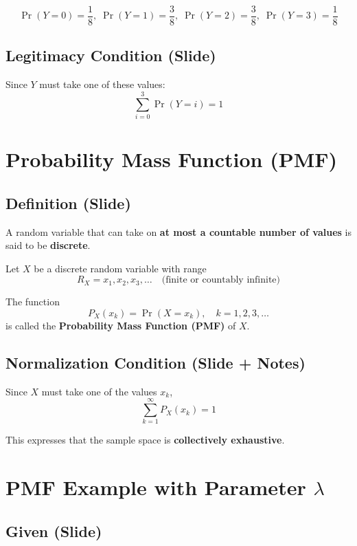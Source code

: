 \documentclass[11pt]{article}
\begin{document}
\[
\Pr(Y=0)=\frac{1}{8},\;
\Pr(Y=1)=\frac{3}{8},\;
\Pr(Y=2)=\frac{3}{8},\;
\Pr(Y=3)=\frac{1}{8}
\]

\subsection*{Legitimacy Condition (Slide)}

Since \( Y \) must take one of these values:
\[
\sum_{i=0}^{3} \Pr(Y=i)=1
\]

\vspace{1em}

\section{Probability Mass Function (PMF)}

\subsection*{Definition (Slide)}

A random variable that can take on \textbf{at most a countable number of values} is said to be \textbf{discrete}.

Let \( X \) be a discrete random variable with range
\[
R_X = x_1, x_2, x_3, \ldots
\quad \text{(finite or countably infinite)}
\]

The function
\[
P_X(x_k) = \Pr(X = x_k), \quad k=1,2,3,\ldots
\]
is called the \textbf{Probability Mass Function (PMF)} of \( X \).

\subsection*{Normalization Condition (Slide + Notes)}

Since \( X \) must take one of the values \( x_k \),
\[
\sum_{k=1}^{\infty} P_X(x_k) = 1
\]

This expresses that the sample space is \textbf{collectively exhaustive}.

\vspace{1em}

\section{PMF Example with Parameter \( \lambda \)}

\subsection*{Given (Slide)}
\end{document}

